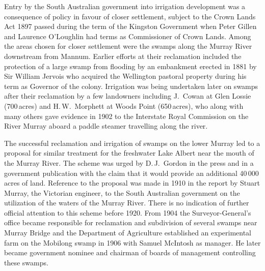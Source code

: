 Entry by the South Australian government into irrigation development
was a consequence of policy in favour of closer settlement, subject to
the Crown Lands Act 1897 
passed during the term of the Kingston Government when Peter Gillen
and Laurence O'Loughlin had terms as Commissioner of Crown Lands.
Among the areas chosen for closer settlement were the swamps along the
Murray River downstream from Mannum.  Earlier efforts at their
reclamation included the protection of a large swamp from flooding by
an embankment erected in 1881 by Sir William Jervois  who acquired the Wellington pastoral property during his term as
Governor of the colony.  Irrigation was being undertaken later on
swamps after their reclamation by a few landowners including J.~Cowan
  at Glen Lossie (700\,acres) and H.\,W.~Morphett
  at Woods Point (650\,acres), who along with
many others gave evidence in 1902 to the Interstate Royal Commission
on the River Murray aboard a paddle steamer travelling along the
river.

The successful reclamation and irrigation of swamps on the lower
Murray led to a proposal for similar treatment for the freshwater Lake
Albert near the mouth of the Murray River.  The scheme was urged by
D.\,J.~Gordon  in the press and in a government
publication with the claim that it would provide an additional
40\,000\,acres of land.  Reference to the proposal was made in 1910 in
the report by Stuart Murray,  the Victorian
engineer, to the South Australian government on the utilization of the
waters of the Murray River. There is no indication of further official
attention to this scheme before 1920.  From 1904 the
Surveyor-General's office became responsible for reclamation and
subdivision of several swamps near Murray Bridge and the Department of
Agriculture established an experimental farm on the Mobilong swamp
 in
1906 with Samuel McIntosh  as manager.  He later
became government nominee and chairman of boards of management
controlling these swamps.

